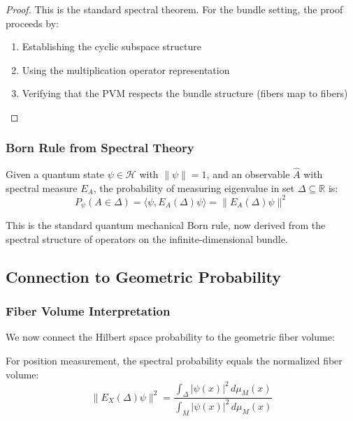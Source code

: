 \begin{proof}
This is the standard spectral theorem. For the bundle setting, the proof proceeds by:
\begin{enumerate}
    \item Establishing the cyclic subspace structure
    \item Using the multiplication operator representation
    \item Verifying that the PVM respects the bundle structure (fibers map to fibers)
\end{enumerate}
\end{proof}

\subsubsection{Born Rule from Spectral Theory}

\begin{theorem}
Given a quantum state $\psi \in \mathcal{H}$ with $\|\psi\| = 1$, and an observable $\hat{A}$ with spectral measure $E_A$, the probability of measuring eigenvalue in set $\Delta \subseteq \mathbb{R}$ is:
\begin{equation}
    P_\psi(A \in \Delta) = \langle \psi, E_A(\Delta) \psi \rangle = \|E_A(\Delta)\psi\|^2
\end{equation}
\end{theorem}

This is the standard quantum mechanical Born rule, now derived from the spectral structure of operators on the infinite-dimensional bundle.

\subsection{Connection to Geometric Probability}

\subsubsection{Fiber Volume Interpretation}

We now connect the Hilbert space probability to the geometric fiber volume:

\begin{theorem}
For position measurement, the spectral probability equals the normalized fiber volume:
\begin{equation}
    \|E_X(\Delta)\psi\|^2 = \frac{\int_\Delta |\psi(x)|^2 \, d\mu_M(x)}{\int_M |\psi(x)|^2 \, d\mu_M(x)}
\end{equation}
\end{theorem}

